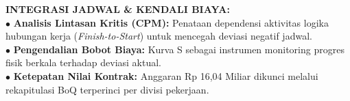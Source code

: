 \documentclass[10pt,a4paper,landscape]{article}
\begin{document}
\begin{minipage}[t]{0.30\linewidth}
  \begin{tcolorbox}[sharp corners, boxrule=0.6pt, colframe=pnavy, colback=pbglight, left=2.5mm, right=2.5mm, top=2mm, bottom=2mm, height=54mm]
    {\fontsize{7pt}{8.5pt}\selectfont\bfseries\color{pnavy}INTEGRASI JADWAL \& KENDALI BIAYA:}\\[1.5mm]
    {\fontsize{6.5pt}{8.2pt}\selectfont\color{psteel}
    $\bullet$ \textbf{Analisis Lintasan Kritis (CPM):} Penataan dependensi aktivitas logika hubungan kerja (\textit{Finish-to-Start}) untuk mencegah deviasi negatif jadwal.\\
    $\bullet$ \textbf{Pengendalian Bobot Biaya:} Kurva S sebagai instrumen monitoring progres fisik berkala terhadap deviasi aktual.\\
    $\bullet$ \textbf{Ketepatan Nilai Kontrak:} Anggaran Rp 16,04 Miliar dikunci melalui rekapitulasi BoQ terperinci per divisi pekerjaan.
    }
  \end{tcolorbox}
\end{minipage}%
\hfill
\end{document}
